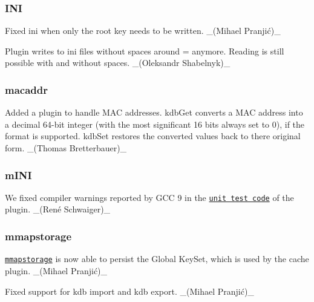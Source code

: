 \subsubsection*{I\+NI}


\begin{DoxyItemize}
\item Fixed {\ttfamily ini} when only the root key needs to be written. \+\_\+(Mihael Pranjić)\+\_\+
\item Plugin writes to ini files without spaces around \textquotesingle{}=\textquotesingle{} anymore. Reading is still possible with and without spaces. \+\_\+(\+Oleksandr Shabelnyk)\+\_\+
\end{DoxyItemize}

\subsubsection*{macaddr}


\begin{DoxyItemize}
\item Added a plugin to handle M\+AC addresses. {\ttfamily kdb\+Get} converts a M\+AC address into a decimal 64-\/bit integer (with the most significant 16 bits always set to 0), if the format is supported. {\ttfamily kdb\+Set} restores the converted values back to there original form. \+\_\+(\+Thomas Bretterbauer)\+\_\+
\end{DoxyItemize}

\subsubsection*{m\+I\+NI}


\begin{DoxyItemize}
\item We fixed compiler warnings reported by G\+CC 9 in the \href{/home/markus/Projekte/Elektra/current/src/plugins/mini/testmod_mini.c}{\tt unit test code} of the plugin. \+\_\+(René Schwaiger)\+\_\+
\end{DoxyItemize}

\subsubsection*{mmapstorage}


\begin{DoxyItemize}
\item \href{https://www.libelektra.org/plugins/mmapstorage}{\tt mmapstorage} is now able to persist the Global Key\+Set, which is used by the {\ttfamily cache} plugin. \+\_\+(Mihael Pranjić)\+\_\+
\item Fixed support for {\ttfamily kdb import} and {\ttfamily kdb export}. \+\_\+(Mihael Pranjić)\+\_\+
\end{DoxyItemize}

